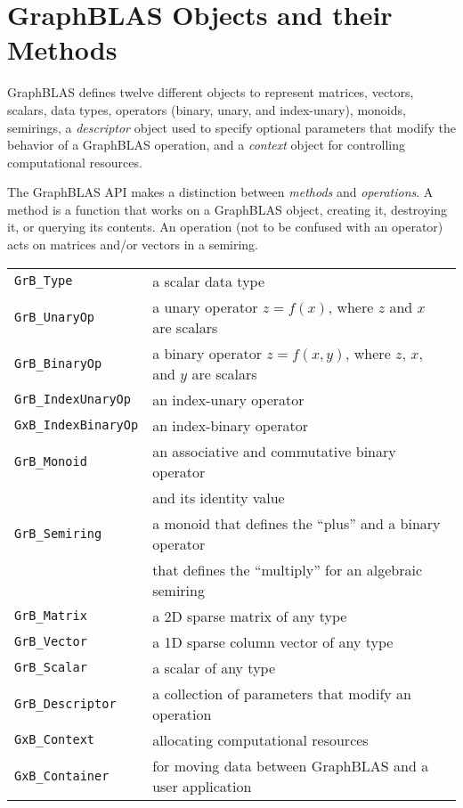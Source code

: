 
\newpage
\section{GraphBLAS Objects and their Methods} %
\label{objects}

GraphBLAS defines twelve different objects to represent matrices, vectors,
scalars, data types, operators (binary, unary, and index-unary), monoids,
semirings, a {\em descriptor} object used to specify optional parameters
that modify the behavior of a GraphBLAS operation, and a {\em context}
object for controlling computational resources.

The GraphBLAS API makes a distinction between {\em methods} and {\em
operations}.  A method is a function that works on a GraphBLAS object, creating
it, destroying it, or querying its contents.  An operation (not to be confused
with an operator) acts on matrices and/or vectors in a semiring.

\vspace{0.1in}
\noindent
{\small
\begin{tabular}{ll}
\hline
\verb'GrB_Type'      & a scalar data type \\
\verb'GrB_UnaryOp'   & a unary operator $z=f(x)$, where $z$ and $x$ are scalars\\
\verb'GrB_BinaryOp'  & a binary operator $z=f(x,y)$, where $z$, $x$, and $y$ are scalars\\
\verb'GrB_IndexUnaryOp'  & an index-unary operator \\
\verb'GxB_IndexBinaryOp'  & an index-binary operator \\
\verb'GrB_Monoid'    & an associative and commutative binary operator  \\
                     & and its identity value \\
\verb'GrB_Semiring'  & a monoid that defines the ``plus'' and a binary operator\\
                     & that defines the ``multiply'' for an algebraic semiring \\
\verb'GrB_Matrix'    & a 2D sparse matrix of any type \\
\verb'GrB_Vector'    & a 1D sparse column vector of any type \\
\verb'GrB_Scalar'    & a scalar of any type \\
\verb'GrB_Descriptor'& a collection of parameters that modify an operation \\
\verb'GxB_Context'   & allocating computational resources \\
\verb'GxB_Container' & for moving data between GraphBLAS and a user application \\
\hline
\end{tabular}
}
\vspace{0.1in}


